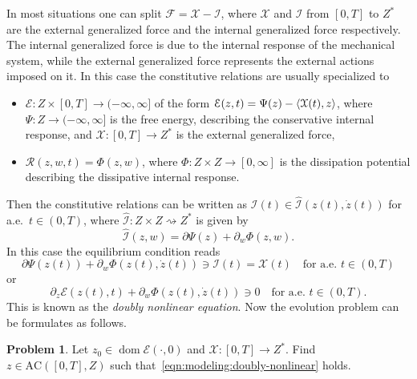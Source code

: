 \documentclass[a4paper,10pt,oneside]{amsbook}
\numberwithin{section}{chapter}
\numberwithin{equation}{chapter}
\theoremstyle{definition}
\newtheorem{prb}[prop]{Problem}
\DeclareMathOperator{\dom}{dom}
\DeclarePairedDelimiter{\dual}{\langle}{\rangle}
\begin{document}
In most situations one can split $\mathcal{F}=\mathcal{X}-\mathcal{I}$, where $\mathcal{X}$ and $\mathcal{I}$ from $[0,T]$ to $Z^*$ are the external generalized force and the internal generalized force respectively. The internal generalized force is due to the internal response of the mechanical system, while the external generalized force represents the external actions imposed on it. In this case the constitutive relations are usually specialized to
\begin{itemize}
\item[(i)] $\mathcal{E}\colon Z\times[0,T]\to(-\infty,\infty]$ of the form $\mathcal{E}(z,t)=\Psi(z)-\dual{\mathcal{X}(t),z}$, where $\Psi\colon Z\to(-\infty,\infty]$ is the free energy, describing the conservative internal response, and $\mathcal{X}\colon[0,T]\to Z^*$ is the external generalized force,
\item[(ii)] $\mathcal{R}(z,w,t)=\Phi(z,w)$, where $\Phi\colon Z\times Z\to[0,\infty]$ is the dissipation potential describing the dissipative internal response.
\end{itemize}
Then the constitutive relations can be written as $\mathcal{I}(t)\in\hat{\mathcal{I}}(z(t),\dot{z}(t))$ for a.e.\ $t\in(0,T)$, where $\hat{\mathcal{I}}\colon Z\times Z\rightsquigarrow Z^*$ is given by
\begin{equation}
\label{eqn:modeling:constitutive}
\hat{\mathcal{I}}(z,w)=\partial\Psi(z)+\partial_w\Phi(z,w).
\end{equation}
In this case the equilibrium condition reads
\begin{equation}
\label{eqn:modeling:doubly:nonlinear-neat}
\partial\Psi(z(t))+\partial_w\Phi(z(t),\dot z(t))\ni\mathcal{I}(t)=\mathcal{X}(t)\quad\text{for a.e.\ $t\in(0,T)$}
\end{equation}
or
\begin{equation}
\label{eqn:modeling:doubly-nonlinear}
\partial_z\mathcal{E}(z(t),t)+\partial_w\Phi(z(t),\dot z(t))\ni0\quad\text{for a.e.\ $t\in(0,T)$}.
\end{equation}
This is known as the \emph{doubly nonlinear equation}. Now the evolution problem can be formulates as follows.
\begin{prb}
\label{prb:modeling:doubly-nonlinear}
Let $z_0\in\dom\mathcal{E}(\cdot,0)$ and $\mathcal{X}\colon[0,T]\to Z^*$. Find $z\in\text{AC}([0,T],Z)$ such that~\eqref{eqn:modeling:doubly-nonlinear} holds.
\end{prb}
\end{document}
